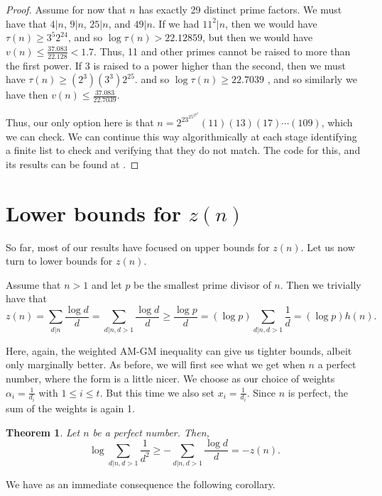 \documentclass{article}
\newtheorem{theorem}{Theorem}
\newtheorem{corollary}[theorem]{Corollary}
\begin{document}
\begin{proof}
Assume for now that $n$ has exactly 29 distinct prime factors. We must have that $4|n$, $9|n$, $25|n$, and $49|n$. If we had $11^2|n$, then we would have $\tau(n) \geq 3^5 2^24$, and so $\log \tau(n) > 22.12859$, but then we would have $v(n) \leq \frac{37.083}{22.128} < 1.7$. Thus, 11 and other primes cannot be raised to more than the first power. If 3 is raised to a power higher than the second, then we must have 
$\tau(n) \geq (2^3)(3^3)2^25$. and so $\log \tau(n) \geq 22.7039$ , and so similarly we have then $v(n) \leq \frac{37.083}{22.7039}$. 

Thus, our only option here is that $n=2^23^25^27^2 (11)(13)(17) \cdots (109)$, which we can check. We can continue this way algorithmically at each stage identifying a finite list to check and verifying that they do not match. The code for this, and its results can be found at  \cite{Tcode}.

\end{proof}

\section{Lower bounds for $z(n)$}

So far, most of our results have focused on upper bounds for $z(n)$. Let us now turn to lower bounds for $z(n)$.

Assume that $n >1$ and let $p$ be the smallest prime divisor of $n$. Then we trivially have 
that $$z(n) = \sum_{d|n} \frac{\log d}{d} = \sum_{d|n, d>1} \frac{\log d}{d} \geq \frac{\log p}{d} = (\log p) \sum_{d|n,d>1} \frac{1}{d} = (\log p)h(n). $$

Here, again, the weighted AM-GM inequality can give us tighter bounds, albeit only marginally better.  As before, we will first see what we get when $n$ a perfect number, where the form is a little nicer. 
We choose as our choice of weights $\alpha_i = \frac{1}{d_i}$ with $1 \leq i \leq t$. But this time we also set $x_i= \frac{1}{d_i}$. Since $n$ is perfect, the sum of the weights is again 1. 

\begin{theorem} Let $n$ be a perfect number. Then,
$$\log \sum_{d|n, d>1} \frac{1}{d^2} \geq -  \sum_{d|n, d>1} \frac{\log d}{d} = - z(n).$$ \label{sum 1/d2 version}
\end{theorem}

We have as an immediate consequence the following corollary. 

\end{document}

